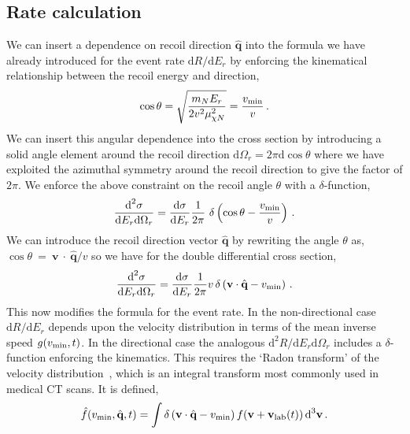 \subsection{Rate calculation}\label{sec:directional_rates}
We can insert a dependence on recoil direction $\hat{\textbf{q}}$ into the formula we have already introduced for the event rate $\textrm{d}R/\textrm{d}E_r$ by enforcing the kinematical relationship between the recoil energy and direction,
\begin{equation}
 \cos{\theta} = \sqrt{\frac{m_N E_r}{2 v^2 \mu^2_{\chi N}}} = \frac{v_\mathrm{min}}{v} \, .
\end{equation}
We can insert this angular dependence into the cross section by introducing a solid angle element around the recoil direction $\textrm{d}\Omega_r = 2\pi \textrm{d} \cos{\theta}$ where we have exploited the azimuthal symmetry around the recoil direction to give the factor of $2\pi$. We enforce the above constraint on the recoil angle $\theta$ with a $\delta$-function,
\begin{equation}
 \frac{\textrm{d}^2\sigma}{\textrm{d}E_r\textrm{d}\Omega_r} = \frac{\textrm{d}\sigma}{\textrm{d}E_r} \frac{1}{2\pi}\ \delta \left( \cos{\theta} - \frac{v_\mathrm{min}}{v}\right) \, .
\end{equation}
We can introduce the recoil direction vector $\hat{\textbf{q}}$ by rewriting the angle $\theta$ as, $\cos{\theta}~=~\textbf{v}~\cdot~\hat{\textbf{q}}/v$ so we have for the double differential cross section,
\begin{equation}
 \frac{\textrm{d}^2\sigma}{\textrm{d}E_r\textrm{d}\Omega_r} = \frac{\textrm{d}\sigma}{\textrm{d}E_r} \frac{1}{2\pi} v \, \delta \left(\textbf{v} \cdot \hat{\textbf{q}} - v_\mathrm{min}\right) \, .
\end{equation}
This now modifies the formula for the event rate. In the non-directional case $\textrm{d}R/\textrm{d}E_r$ depends upon the velocity distribution in terms of the mean inverse speed $g(v_\mathrm{min},t)$. In the directional case the analogous $\textrm{d}^2 R/\textrm{d}E_r\textrm{d}\Omega_r$ includes a $\delta$-function enforcing the kinematics. This requires the `Radon transform' of the velocity distribution~\cite{Radon,Gondolo:2002np}, which is an integral transform most commonly used in medical CT scans. It is defined,
\begin{equation}
 \hat{f}(v_\mathrm{min},\hat{\textbf{q}},t) = \int \delta\left(\textbf{v} \cdot \hat{\textbf{q}} - v_\mathrm{min}\right) f(\textbf{v}+\textbf{v}_\textrm{lab}(t))\, \textrm{d}^3 \textbf{v}\, .
\end{equation}
